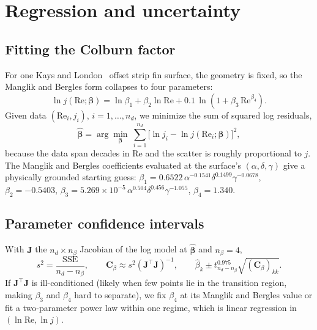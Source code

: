\documentclass[11pt]{article}
\newcommand{\Rey}{\mathrm{Re}}
\begin{document}
\section{Regression and uncertainty}

\subsection{Fitting the Colburn factor}

For one Kays and London~\cite{kays1984} offset strip fin surface, the geometry is fixed, so the Manglik and Bergles form collapses to four parameters:
\begin{equation}
  \ln j(\Rey;\bm\beta) = \ln\beta_1 + \beta_2\ln\Rey + 0.1\,\ln\!\left(1 + \beta_3\,\Rey^{\beta_4}\right).
\end{equation}
Given data $(\Rey_i, j_i)$, $i = 1,\dots,n_d$, we minimize the sum of squared log residuals,
\begin{equation}
  \hat{\bm\beta} = \arg\min_{\bm\beta}\ \sum_{i=1}^{n_d}\Big[\ln j_i - \ln j(\Rey_i;\bm\beta)\Big]^2,
\end{equation}
because the data span decades in $\Rey$ and the scatter is roughly proportional to $j$. The Manglik and Bergles coefficients evaluated at the surface's $(\alpha,\delta,\gamma)$ give a physically grounded starting guess: $\beta_1 = 0.6522\,\alpha^{-0.1541}\delta^{0.1499}\gamma^{-0.0678}$, $\beta_2 = -0.5403$, $\beta_3 = 5.269\times10^{-5}\,\alpha^{0.504}\delta^{0.456}\gamma^{-1.055}$, $\beta_4 = 1.340$.

\subsection{Parameter confidence intervals}

With $\bm J$ the $n_d \times n_\beta$ Jacobian of the log model at $\hat{\bm\beta}$ and $n_\beta = 4$,
\begin{equation}
  s^2 = \frac{\mathrm{SSE}}{n_d - n_\beta},
  \qquad
  \bm C_\beta \approx s^2\left(\bm J^\top\bm J\right)^{-1},
  \qquad
  \hat\beta_k \pm t_{n_d - n_\beta}^{0.975}\sqrt{(\bm C_\beta)_{kk}} .
\end{equation}
If $\bm J^\top\bm J$ is ill-conditioned (likely when few points lie in the transition region, making $\beta_3$ and $\beta_4$ hard to separate), we fix $\beta_4$ at its Manglik and Bergles value or fit a two-parameter power law within one regime, which is linear regression in $(\ln\Rey, \ln j)$.
\end{document}

